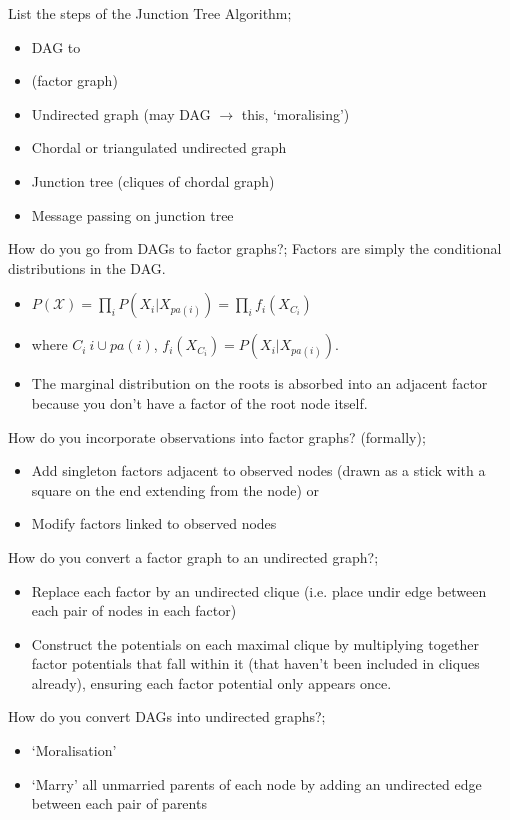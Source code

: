 \documentclass{article}
\begin{document}
List the steps of the Junction Tree Algorithm; \begin{itemize} \item DAG to \item (factor graph) \item Undirected graph (may DAG $\rightarrow$ this, `moralising') \item Chordal or triangulated undirected graph \item Junction tree (cliques of chordal graph) \item Message passing on junction tree \end{itemize}

How do you go from DAGs to factor graphs?; Factors are simply the conditional distributions in the DAG. \begin{itemize} \item $P(\mathcal{X})=\prod_i P(X_i|X_{pa(i)})= \prod_i f_i(X_{C_i})$ \item where $C_i \ i\cup pa(i)$, $f_i(X_{C_i})=P(X_i|X_{pa(i)})$.  \item The marginal distribution on the roots is absorbed into an adjacent factor because you don't have a factor of the root node itself.  \end{itemize}

How do you incorporate observations into factor graphs? (formally); \begin{itemize} \item Add singleton factors adjacent to observed nodes (drawn as a stick with a square on the end extending from the node) or \item Modify factors linked to observed nodes \end{itemize}

How do you convert a factor graph to an undirected graph?; \begin{itemize} \item Replace each factor by an undirected clique (i.e. place undir edge between each pair of nodes in each factor) \item Construct the potentials on each maximal clique by multiplying together factor potentials that fall within it (that haven't been included in cliques already), ensuring each factor potential only appears once.  \end{itemize}

How do you convert DAGs into undirected graphs?; \begin{itemize} \item `Moralisation' \item `Marry' all unmarried parents of each node by adding an undirected edge between each pair of parents \end{itemize}
\end{document}

